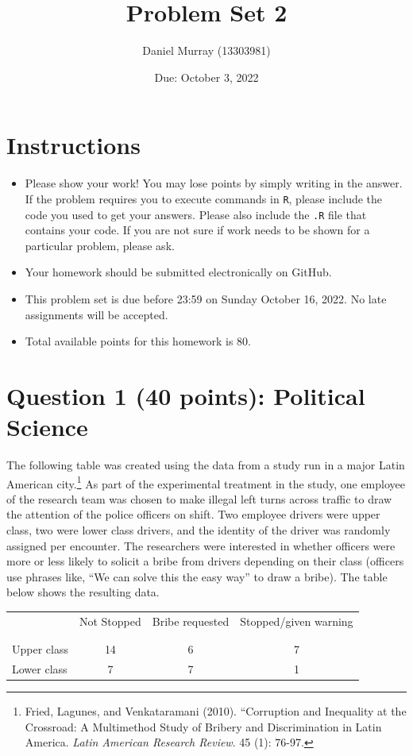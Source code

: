 \documentclass[12pt,letterpaper]{article}
\title{Problem Set 2}
\date{Due: October 3, 2022}
\author{Daniel Murray (13303981)}
\begin{document}
	\maketitle
	\section*{Instructions}
\begin{itemize}
	\item Please show your work! You may lose points by simply writing in the answer. If the problem requires you to execute commands in \texttt{R}, please include the code you used to get your answers. Please also include the \texttt{.R} file that contains your code. If you are not sure if work needs to be shown for a particular problem, please ask.
	\item Your homework should be submitted electronically on GitHub.
	\item This problem set is due before 23:59 on Sunday October 16, 2022. No late assignments will be accepted.
	\item Total available points for this homework is 80.
\end{itemize}

	
	\vspace{.5cm}
	\section*{Question 1 (40 points): Political Science}
		\vspace{.25cm}
	The following table was created using the data from a study run in a major Latin American city.\footnote{Fried, Lagunes, and Venkataramani (2010). ``Corruption and Inequality at the Crossroad: A Multimethod Study of Bribery and Discrimination in Latin America. \textit{Latin American Research Review}. 45 (1): 76-97.} As part of the experimental treatment in the study, one employee of the research team was chosen to make illegal left turns across traffic to draw the attention of the police officers on shift. Two employee drivers were upper class, two were lower class drivers, and the identity of the driver was randomly assigned per encounter. The researchers were interested in whether officers were more or less likely to solicit a bribe from drivers depending on their class (officers use phrases like, ``We can solve this the easy way'' to draw a bribe). The table below shows the resulting data.

\newpage
\begin{table}[h!]
	\centering
	\begin{tabular}{l | c c c }
		& Not Stopped & Bribe requested & Stopped/given warning \\
		\\[-1.8ex] 
		\hline \\[-1.8ex]
		Upper class & 14 & 6 & 7 \\
		Lower class & 7 & 7 & 1 \\
		\hline
	\end{tabular}
\end{table}
\end{document}
